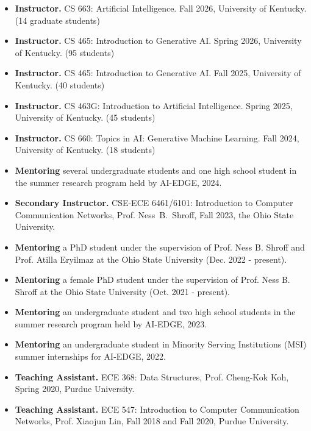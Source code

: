 \documentclass[10pt,letter]{article}
\begin{document}
\begin{small}
\begin{itemize}
\item {\bf Instructor.} CS 663: Artificial Intelligence. Fall 2026, University of Kentucky. (14 graduate students)

\item {\bf Instructor.} CS 465: Introduction to Generative AI. Spring 2026, University of Kentucky. (95 students)

\item {\bf Instructor.} CS 465: Introduction to Generative AI. Fall 2025, University of Kentucky. (40 students)

\item {\bf Instructor.} CS 463G: Introduction to Artificial Intelligence. Spring 2025, University of Kentucky. (45 students)

\item {\bf Instructor.} CS 660: Topics in AI: Generative Machine Learning. Fall 2024, University of Kentucky. (18 students)

\item {\bf Mentoring} several undergraduate students and one high school student in the summer research program held by AI-EDGE, 2024.

\item {\bf Secondary Instructor.} CSE-ECE 6461/6101:
Introduction to Computer
Communication Networks, Prof. Ness~B.~Shroff, Fall 2023, the Ohio State University.

\item {\bf Mentoring} a PhD student under the supervision of Prof. Ness B. Shroff and Prof. Atilla Eryilmaz at the Ohio State University (Dec. 2022 - present).

\item {\bf Mentoring} a female PhD student under the supervision of Prof. Ness B. Shroff at the Ohio State University (Oct. 2021 - present).

\item {\bf Mentoring} an undergraduate student and two high school students in the summer research program held by AI-EDGE, 2023.

\item {\bf Mentoring} an undergraduate student in Minority Serving Institutions (MSI) summer internships for AI-EDGE, 2022.

\item {\bf Teaching Assistant.} ECE 368: Data Structures, Prof. Cheng-Kok Koh, Spring 2020, Purdue University.

\item {\bf Teaching Assistant.} ECE 547: Introduction to Computer Communication Networks, Prof. Xiaojun Lin, Fall 2018 and Fall 2020, Purdue University.


\end{itemize}
\end{small}
\end{document}
